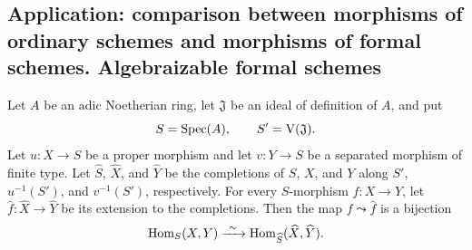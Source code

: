 \subsection{Application: comparison between morphisms of ordinary schemes and morphisms of formal schemes. Algebraizable formal schemes}
\label{subsection:III.5.4}

\begin{theorem}[5.4.1]
\label{III.5.4.1}
Let $A$ be an adic Noetherian ring, let $\mathfrak{J}$ be an ideal
of definition of $A$, and put
\[
  S=\operatorname{Spec}(A),\qquad S'=\mathrm{V}(\mathfrak{J}).
\]
Let $u:X\to S$ be a proper morphism and let $v:Y\to S$ be a
separated morphism of finite type.  Let
$\widehat{S}$, $\widehat{X}$, and $\widehat{Y}$ be the completions
of $S$, $X$, and $Y$ along $S'$, $u^{-1}(S')$, and $v^{-1}(S')$,
respectively.  For every $S$-morphism $f:X\to Y$, let
$\widehat{f}:\widehat{X}\to\widehat{Y}$ be its extension to the
completions.  Then the map $f\leadsto\widehat{f}$ is a bijection
\[
  \operatorname{Hom}_S(X,Y)
  \xrightarrow{\ \sim\ }
  \operatorname{Hom}_{\widehat{S}}(\widehat{X},\widehat{Y}).
\]
\end{theorem}

